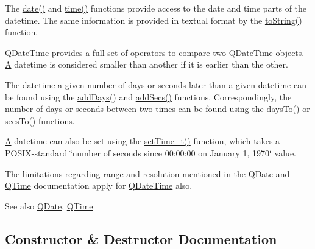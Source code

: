 The \mbox{\hyperlink{class_q_date_time_ae7d86dc9b95e2aeab38391033eeff9eb}{date()}} and \mbox{\hyperlink{class_q_date_time_a7b8eefbd04093747deb22f5cd6b673c1}{time()}} functions provide access to the date and time parts of the datetime. The same information is provided in textual format by the \mbox{\hyperlink{class_q_date_time_a5455d25292813109f21c15888552c5c9}{to\+String()}} function.

\mbox{\hyperlink{class_q_date_time}{Q\+Date\+Time}} provides a full set of operators to compare two \mbox{\hyperlink{class_q_date_time}{Q\+Date\+Time}} objects. \mbox{\hyperlink{class_a}{A}} datetime is considered smaller than another if it is earlier than the other.

The datetime a given number of days or seconds later than a given datetime can be found using the \mbox{\hyperlink{class_q_date_time_adeea3cac98a8c074fecf486094a9bbaf}{add\+Days()}} and \mbox{\hyperlink{class_q_date_time_a7b48ae870775460aec8791465c2e5056}{add\+Secs()}} functions. Correspondingly, the number of days or seconds between two times can be found using the \mbox{\hyperlink{class_q_date_time_a80a194c8ecef4133a9bff3aeb4546934}{days\+To()}} or \mbox{\hyperlink{class_q_date_time_a3b697a289865bc96bd339acaa75880b3}{secs\+To()}} functions.

\mbox{\hyperlink{class_a}{A}} datetime can also be set using the \mbox{\hyperlink{class_q_date_time_a889dac98cb29b4b9f33cfea6f00db98b}{set\+Time\+\_\+t()}} function, which takes a P\+O\+S\+I\+X-\/standard \char`\"{}number of seconds since 00\+:00\+:00 on January
1, 1970\char`\"{} value.

The limitations regarding range and resolution mentioned in the \mbox{\hyperlink{class_q_date}{Q\+Date}} and \mbox{\hyperlink{class_q_time}{Q\+Time}} documentation apply for \mbox{\hyperlink{class_q_date_time}{Q\+Date\+Time}} also.

\begin{DoxySeeAlso}{See also}
\mbox{\hyperlink{class_q_date}{Q\+Date}}, \mbox{\hyperlink{class_q_time}{Q\+Time}} 
\end{DoxySeeAlso}


\subsection{Constructor \& Destructor Documentation}
\mbox{\label{class_q_date_time_a497eebb04afafe0ec04d02417b57aba8}} 
